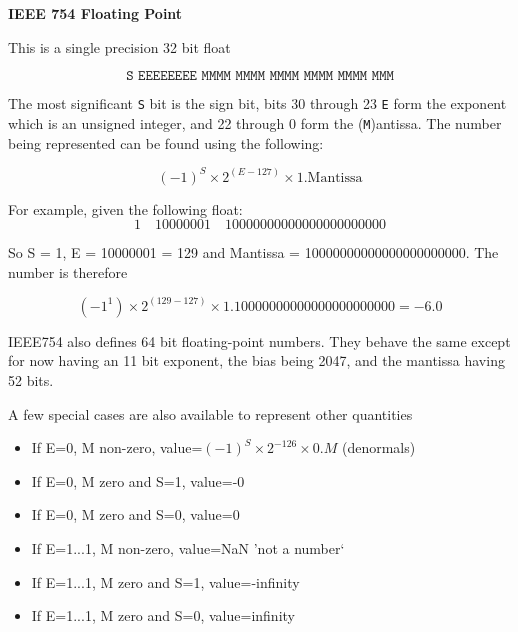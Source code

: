\documentclass[10pt]{article}
\begin{document}
\begin{definition}
	\textbf{IEEE 754 Floating Point}

	This is a single precision 32 bit float

	\begin{equation}
		\texttt{S  EEEEEEEE  MMMM MMMM MMMM MMMM MMMM MMM}
	\end{equation}
	

	The most significant \texttt{S} bit is the sign bit, bits 30 through 23 \texttt{E} form the exponent which is an unsigned integer, and 22 through 0 form the (\texttt{M})antissa. The number being represented can be found using the following:

	\begin{equation}
	(-1)^S \times 2 ^ {(E-127)} \times 1.\text{Mantissa}
		\label{eq:352:float32_eq}
	\end{equation}

	\begin{example}
		For example, given the following float:
		\begin{equation*}
			1\quad10000001\quad10000000000000000000000
		\end{equation*}
		
		So S = 1, E = 10000001 = 129 and Mantissa = 10000000000000000000000.
		The number is therefore

		\begin{equation}
			(-1^1) \times 2^{(129-127)} \times 1.10000000000000000000000 = -6.0
		\end{equation}
	\end{example}


	IEEE754 also defines 64 bit floating-point numbers. They behave the same except for now having an 11 bit exponent, the bias being 2047, and the mantissa having 52 bits.


	A few special cases are also available to represent other quantities

	\begin{itemize}
	\item If E=0, M non-zero, value=$(-1)^S \times 2^{-126} \times 0.M$ (denormals)
		\item If E=0, M zero and S=1, value=-0
		\item If E=0, M zero and S=0, value=0
		\item If E=1...1, M non-zero, value=NaN 'not a number`
		\item If E=1...1, M zero and S=1, value=-infinity
		\item If E=1...1, M zero and S=0, value=infinity
	\end{itemize}


\end{definition}
\end{document}

